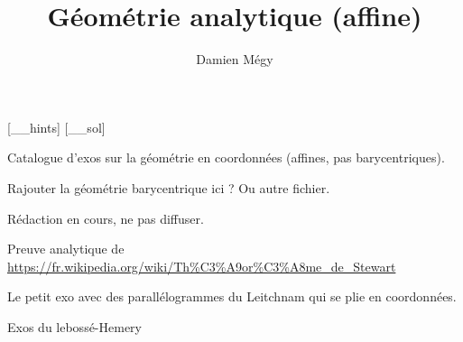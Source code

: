 





[_\jobname_hints]
[_\jobname_sol]


\title{Géométrie analytique (affine)}
\author{Damien Mégy}
\maketitle

Catalogue d'exos sur la géométrie en coordonnées (affines, pas barycentriques).

Rajouter la géométrie barycentrique ici ? Ou autre fichier.

Rédaction en cours, ne pas diffuser.


\begin{exo}
Preuve analytique de \url{https://fr.wikipedia.org/wiki/Th%C3%A9or%C3%A8me_de_Stewart}
\begin{hint}
\end{hint}
\begin{sol}
\end{sol}
\end{exo}

\begin{exo}
Le petit exo avec des parallélogrammes du Leitchnam qui se plie en coordonnées.
\begin{hint}
\end{hint}
\begin{sol}
\end{sol}
\end{exo}

\begin{exo}
Exos du lebossé-Hemery
\begin{hint}
\end{hint}
\begin{sol}
\end{sol}
\end{exo}

\begin{exo}
\begin{hint}
\end{hint}
\begin{sol}
\end{sol}
\end{exo}

\begin{exo}
\begin{hint}
\end{hint}
\begin{sol}
\end{sol}
\end{exo}



\indications
\correction



